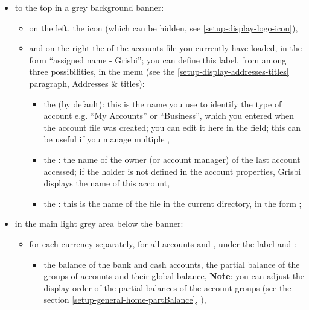 \begin{itemize}
	\item to the top in a grey background banner:
		\begin{itemize}
			\item on the left, the  icon (which can be hidden, see \vref{setup-display-logo-icon}),
			\item and on the right the  of the accounts file you currently have loaded, in the form \enquote{assigned name - Grisbi}; you can define this label, from among three possibilities, in the  menu (see the \vref{setup-display-addresses-titles} paragraph, Addresses \& titles):
				\begin{itemize}
					\item the  (by default): this is the name you use to identify the type of account e.g. \enquote{My Accounts} or \enquote{Business}, which you entered when the account file was created; you can edit it here in the  field; this can be useful if you manage multiple , 
					\item the : the name of the owner (or account manager) of the last account accessed; if the holder is not defined in the account properties, Grisbi displays the name of this account,
					\item the : this is the name of the file in the current directory, in the form  ;
				\end{itemize}
		\end{itemize}
	\item in the main light grey area below the banner:
		\begin{itemize}
			\item for each currency separately, for all accounts and , under the label  and :
				\begin{itemize}
					\item the balance of the bank and cash accounts, the partial balance of the groups of accounts and their global balance,
					\newline
					\textbf{Note}: you can adjust the display order of the partial balances of the account groups (see the section \vref{setup-general-home-partBalance}, ),		 

\end{itemize}
\end{itemize}
\end{itemize}
